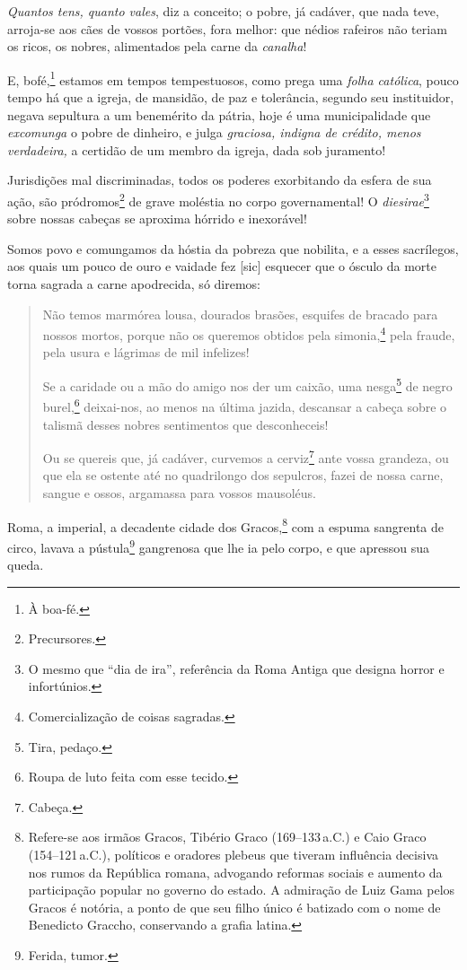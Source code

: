 \emph{Quantos tens, quanto vales}, diz a conceito; o pobre, já cadáver,
que nada teve, arroja-se aos cães de vossos portões, fora melhor: que
nédios rafeiros não teriam os ricos, os nobres, alimentados pela carne
da \emph{canalha}!

E, bofé,\footnote{À boa-fé.} estamos em tempos tempestuosos, como
prega uma \emph{folha católica}, pouco tempo há que a igreja, de
mansidão, de paz e tolerância, segundo seu instituidor, negava sepultura
a um benemérito da pátria, hoje é uma municipalidade que
\emph{excomunga} o pobre de dinheiro, e julga \emph{graciosa, indigna de
crédito, menos verdadeira,} a certidão de um membro da igreja, dada sob
juramento!

Jurisdições mal discriminadas, todos os poderes exorbitando da esfera de
sua ação, são pródromos\footnote{Precursores.} de grave moléstia no
corpo governamental! O \emph{diesirae}\footnote{O mesmo que ``dia de
  ira'', referência da Roma Antiga que designa horror e infortúnios.}
sobre nossas cabeças se aproxima hórrido e inexorável!

Somos povo e comungamos da hóstia da pobreza que nobilita, e a esses
sacrílegos, aos quais um pouco de ouro e vaidade fez {[}sic{]} esquecer
que o ósculo da morte torna sagrada a carne apodrecida, só diremos:

\begin{quote}
Não temos marmórea lousa, dourados brasões, esquifes de bracado para %
nossos mortos, porque não os queremos obtidos pela simonia,\footnote{
  Comercialização de coisas sagradas.} pela fraude, pela usura e
lágrimas de mil infelizes!

Se a caridade ou a mão do amigo nos der um caixão, uma nesga\footnote{
  Tira, pedaço.} de negro burel,\footnote{Roupa de luto feita com esse
  tecido.} deixai-nos, ao menos na última jazida, descansar a cabeça
sobre o talismã desses nobres sentimentos que desconheceis!

Ou se quereis que, já cadáver, curvemos a cerviz\footnote{Cabeça.}
ante vossa grandeza, ou que ela se ostente até no quadrilongo dos
sepulcros, fazei de nossa carne, sangue e ossos, argamassa para vossos
mausoléus.
\end{quote}

\noindent\dotfill

Roma, a imperial, a decadente cidade dos Gracos,\footnote{Refere-se aos
  irmãos Gracos, Tibério Graco (169--133\,a.C.) e Caio Graco (154--121\,a.C.), 
  políticos e oradores plebeus que tiveram influência
  decisiva nos rumos da República romana, advogando reformas sociais e
  aumento da participação popular no governo do estado. A admiração de
  Luiz Gama pelos Gracos é notória, a ponto de que seu filho único é
  batizado com o nome de Benedicto Graccho, conservando a grafia latina.\label{graco}}
com a espuma sangrenta de circo, lavava a pústula\footnote{Ferida,
  tumor.} gangrenosa que lhe ia pelo corpo, e que apressou sua queda.

